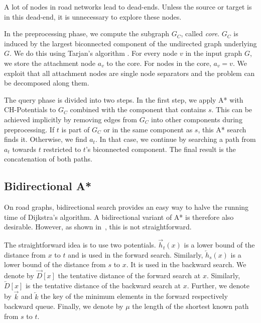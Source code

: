 \documentclass[manuscript,review]{acmart}
\begin{document}
A lot of nodes in road networks lead to dead-ends.
Unless the source or target is in this dead-end, it is unnecessary to explore these nodes.

In the preprocessing phase, we compute the subgraph $G_C$, called \emph{core}.
$G_C$ is induced by the largest biconnected component of the undirected graph underlying $G$.
We do this using Tarjan's algorithm \cite{t-dfslg2-72}.
For every node $v$ in the input graph $G$, we store the attachment node $a_v$ to the core.
For nodes in the core, $a_v=v$.
We exploit that all attachment nodes are single node separators and the problem can be decomposed along them.

The query phase is divided into two steps.
In the first step, we apply A* with CH-Potentials to $G_C$ combined with the component that contains $s$.
This can be achieved implicitly by removing edges from $G_C$ into other components during preprocessing.
If $t$ is part of $G_C$ or in the same component as $s$, this A* search finds it.
Otherwise, we find $a_t$.
In that case, we continue by searching a path from $a_t$ towards $t$ restricted to $t$'s biconnected component.
The final result is the concatenation of both paths.

\subsection{Bidirectional A*}\label{sec:bidir_astar}


On road graphs, bidirectional search provides an easy way to halve the running time of Dijkstra's algorithm.
A bidirectional variant of A* is therefore also desirable.
However, as shown in~\cite{gh-cspas-05}, this is not straightforward.

The straightforward idea is to use two potentials.
$\overrightarrow{h}_t(x)$ is a lower bound of the distance from $x$ to $t$ and is used in the forward search.
Similarly, $\overleftarrow{h}_s(x)$ is a lower bound of the distance from $s$ to $x$.
It is used in the backward search.
We denote by $\overrightarrow{D}[x]$ the tentative distance of the forward search at $x$.
Similarly, $\overleftarrow{D}[x]$ is the tentative distance of the backward search at $x$.
Further, we denote by $\overrightarrow{k}$ and $\overleftarrow{k}$ the key of the minimum elements in the forward respectively backward queue.
Finally, we denote by $\mu$ the length of the shortest known path from $s$ to $t$.
\end{document}
